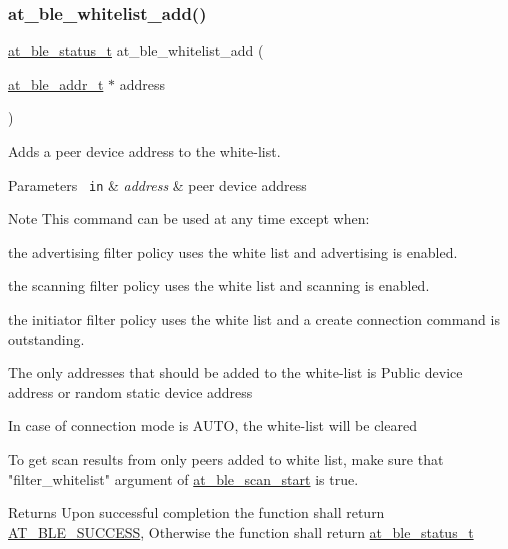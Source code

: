 \subsubsection{\texorpdfstring{at\_ble\_whitelist\_add()}{at\_ble\_whitelist\_add()}}
{\footnotesize\ttfamily \mbox{\hyperlink{group__error__codes__group_ga3b1db9b95feb157b3c188ca27fe76988}{at\+\_\+ble\+\_\+status\+\_\+t}} at\+\_\+ble\+\_\+whitelist\+\_\+add (\begin{DoxyParamCaption}\item[{\mbox{\hyperlink{structat__ble__addr__t}{at\+\_\+ble\+\_\+addr\+\_\+t}} $\ast$}]{address }\end{DoxyParamCaption})}



Adds a peer device address to the white-\/list. 


\begin{DoxyParams}[1]{Parameters}
\mbox{\texttt{ in}}  & {\em address} & peer device address\\
\hline
\end{DoxyParams}
\begin{DoxyNote}{Note}
This command can be used at any time except when\+:
\begin{DoxyItemize}
\item the advertising filter policy uses the white list and advertising is enabled.
\item the scanning filter policy uses the white list and scanning is enabled.
\item the initiator filter policy uses the white list and a create connection command is outstanding.
\end{DoxyItemize}

The only addresses that should be added to the white-\/list is Public device address or random static device address

In case of connection mode is A\+U\+TO, the white-\/list will be cleared

To get scan results from only peers added to white list, make sure that "filter\+\_\+whitelist" argument of \mbox{\hyperlink{group__gap__scan__group_ga26972125714f8cee1bc5a59d5b82623f}{at\+\_\+ble\+\_\+scan\+\_\+start}} is true.
\end{DoxyNote}
\begin{DoxyReturn}{Returns}
Upon successful completion the function shall return \mbox{\hyperlink{group__error__codes__group_gga3b1db9b95feb157b3c188ca27fe76988a7e3bfff5387331cd4f2c56cbcbbd7e19}{A\+T\+\_\+\+B\+L\+E\+\_\+\+S\+U\+C\+C\+E\+SS}}, Otherwise the function shall return \mbox{\hyperlink{at__ble__api_8h_ace24eb4e5ca3f325c663b809da5feb92}{at\+\_\+ble\+\_\+status\+\_\+t}} 
\end{DoxyReturn}
\mbox{\label{group__gap__whitelist__group_gae25e4c2f9252f3080b2a784c84159564}} 
